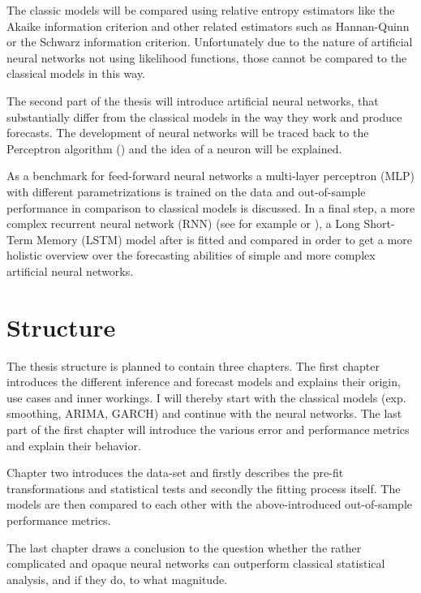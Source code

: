 \documentclass[11pt, a4paper, twocolumn]{article}
\begin{document}
The classic models will be compared using relative entropy estimators like the Akaike information criterion and other related estimators such as Hannan-Quinn or the Schwarz information criterion. Unfortunately due to the nature of artificial neural networks not using likelihood functions, those cannot be compared to the classical models in this way. 

The second part of the thesis will introduce artificial neural networks, that substantially differ from the classical models in the way they work and produce forecasts. The development of neural networks will be traced back to the Perceptron algorithm (\citet{rosenblatt1957perceptron}) and the idea of a neuron will be explained. 

As a benchmark for feed-forward neural networks a multi-layer perceptron (MLP) with different parametrizations is trained on the data and out-of-sample performance in comparison to classical models is discussed. In a final step, a more complex recurrent neural network (RNN) (see for example \citet{williams1989learning} or \citet{werbos1990backpropagation}), a Long Short-Term Memory (LSTM) model after \citet{hochreiter1997long} is fitted and compared in order to get a more holistic overview over the forecasting abilities of simple and more complex artificial neural networks.

\section{Structure}

The thesis structure is planned to contain three chapters. The first chapter introduces the different inference and forecast models and explains their origin, use cases and inner workings. I will thereby start with the classical models (exp. smoothing, ARIMA, GARCH) and continue with the neural networks. The last part of the first chapter will introduce the various error and performance metrics and explain their behavior. 

Chapter two introduces the data-set and firstly describes the pre-fit transformations and statistical tests and secondly the fitting process itself. The models are then compared to each other with the above-introduced out-of-sample performance metrics. 

The last chapter draws a conclusion to the question whether the rather complicated and opaque neural networks can outperform classical statistical analysis, and if they do, to what magnitude. 




\printbibliography[title={References}] %

\end{document}
